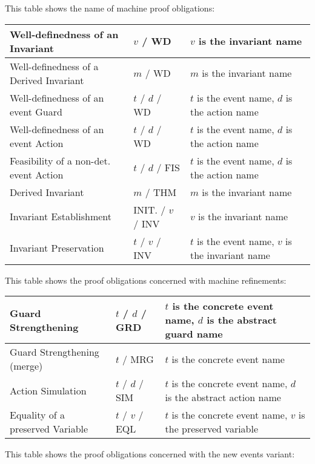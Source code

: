 This table shows the name of machine proof obligations:

\begin{center}
    \begin{tabular}{| p{6cm} | p{3cm} | p{5cm} |}
    \hline
	Well-definedness of an Invariant & $v$  / WD & $v$ is the invariant name\\ \hline
	Well-definedness of a Derived Invariant & $m$  / WD & $m$ is the invariant name \\ \hline
	Well-definedness of an event Guard & $t$  / $d$  / WD & $t$ is the event name, $d$ is the action name  \\ \hline
	Well-definedness of an event Action & $t$  / $d$  / WD & $t$ is the event name, $d$ is the action name  \\ \hline
	Feasibility of a non-det. event Action & $t$  / $d$  / FIS & $t$ is the event name, $d$ is the action name  \\ \hline
	Derived Invariant & $m$ / THM & $m$ is the invariant name \\ \hline
	Invariant Establishment & INIT.  / $v$  / INV & $v$ is the invariant name  \\ \hline
	Invariant Preservation & $t$  / $v$  / INV & $t$ is the event name, $v$ is the invariant name  \\ \hline
    \end{tabular}
\end{center}

This table shows the proof obligations concerned with machine refinements:

\begin{center}
    \begin{tabular}{| p{6cm} | p{3cm} | p{5cm} |}
    \hline
	Guard Strengthening & $t$  / $d$  / GRD & $t$ is the concrete event name, $d$ is the abstract guard name\\ \hline
	Guard Strengthening (merge) & $t$  / MRG & $t$ is the concrete event name \\ \hline
	Action Simulation & $t$  / $d$  / SIM & $t$ is the concrete event name, $d$ is the abstract action name  \\ \hline
	Equality of a preserved Variable & $t$  / $v$  / EQL & $t$ is the concrete event name, $v$ is the preserved variable  \\ \hline
    \end{tabular}
\end{center}

This table shows the proof obligations concerned with the new events variant:

